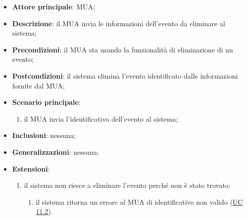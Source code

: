     \begin{itemize}
        \item \textbf{Attore principale}: MUA;
        \item \textbf{Descrizione}: il MUA invia le informazioni dell'evento da eliminare al sistema;
        \item \textbf{Precondizioni}: il MUA sta usando la funzionalità di eliminazione di un evento;
        \item \textbf{Postcondizioni}: il sistema elimina l'evento identificato dalle informazioni fornite dal MUA;
        \item \textbf{Scenario principale}:
            \begin{enumerate}
                \item il MUA invia l'identificativo dell'evento al sistema;
            \end{enumerate}
        \item \textbf{Inclusioni}: nessuna;
        \item \textbf{Generalizzazioni}: nessuna;
        \item \textbf{Estensioni}:
            \begin{enumerate}[label=\alph*.]
                \item il sistema non riesce a eliminare l'evento perché non è stato trovato:
                \begin{enumerate}[label=\arabic*.]
                    \item il sistema ritorna un errore al MUA di identificativo non valido (\hyperref[sec:UC11.2]{UC 11.2}).
                \end{enumerate}
            \end{enumerate}
    \end{itemize}


